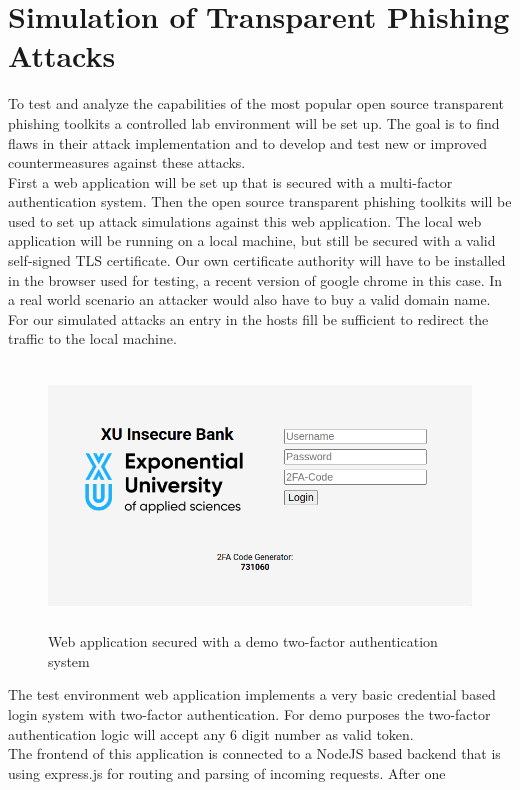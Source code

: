 \documentclass[12pt]{scrbook}
\begin{document}
\section{Simulation of Transparent Phishing Attacks}
To test and analyze the capabilities of the most popular open source
transparent phishing toolkits a controlled lab environment will be set up. The
goal is to find flaws in their attack implementation and to develop and test new
or improved countermeasures against these attacks.\\ First a web application
will be set up that is secured with a multi-factor authentication system. Then
the open source transparent phishing toolkits will be used to set up attack
simulations against this web application. The local web application will be
running on a local machine, but still be secured with a valid self-signed TLS
certificate. Our own certificate authority will have to be installed in the
browser used for testing, a recent version of google chrome in this case. In a
real world scenario an attacker would also have to buy a valid domain name. For
our simulated attacks an entry in the hosts fill be sufficient to redirect the
traffic to the local machine.\\ \begin{figure}[!htb] \centering
	\includegraphics[height=7cm]{./images/2fa_app.png} \caption{Web application
		secured with a demo two-factor authentication system} \end{figure} The test
environment web application implements a very basic credential based login
system with two-factor authentication. For demo purposes the two-factor
authentication logic will accept any 6 digit number as valid token.\\The
frontend of this application is connected to a NodeJS based backend that is
using express.js for routing and parsing of incoming requests. After one
\end{document}
